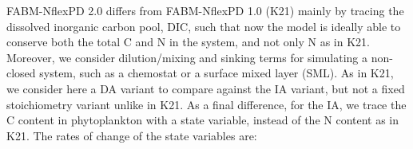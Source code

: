 \documentclass[gmd, manuscript]{copernicus}
\begin{document}
FABM-NflexPD 2.0 differs from FABM-NflexPD 1.0 (K21) 
mainly by tracing the dissolved inorganic carbon pool, DIC, such that now the model is ideally able to conserve both the total C and N in the system, and not only N as in K21. Moreover, we consider dilution/mixing and sinking terms for simulating a non-closed system, such as a chemostat or a surface mixed layer (SML). As in K21, we consider here a DA variant to compare against the IA variant, but not a fixed stoichiometry variant unlike in K21. As a final difference, for the IA, we trace the C content in phytoplankton with a state variable, instead of the N content as in K21. The rates of change of the state variables are:
\end{document}
